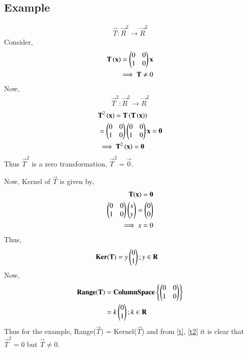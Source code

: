 \documentclass[journal,12pt,twocolumn]{IEEEtran}
\begin{document}
\subsection{Example}
\begin{align}
    \vec{T} : \vec{R}^2 \xrightarrow{} \vec{R}^2
\end{align}
Consider, 
\begin{align}
    \mathbf{T}\left(\mathbf{x}\right) = \begin{pmatrix}0&0\\1&0\end{pmatrix}\mathbf{x} \\
    \implies \mathbf{T} \ne 0 \label{t}
\end{align}
Now,
\begin{align}
    \vec{T}^2 : \vec{R}^2 \xrightarrow{} \vec{R}^2
\end{align}
\begin{align}
    &\mathbf{T}^2\left(\mathbf{x}\right) = \mathbf{T}\left(\mathbf{T}\left(\mathbf{x}\right)\right) \\
    &= \begin{pmatrix}0&0\\1&0\end{pmatrix}\begin{pmatrix}0&0\\1&0\end{pmatrix}\mathbf{x} = \mathbf{0} \\
    &\implies \mathbf{T}^2\left(\mathbf{x}\right) = \mathbf{0} \label{t2}
\end{align}
Thus $\vec{T}^2$ is a zero transformation, $\vec{T}^2 = \vec{0}$.

Now, Kernel of $\vec{T}$ is given by,
\begin{align}
    \mathbf{T}(\mathbf{x}) = \mathbf{0}  \\
    \begin{pmatrix}0&0\\1&0\end{pmatrix}\begin{pmatrix}x\\y\end{pmatrix} = \begin{pmatrix}0\\0\end{pmatrix} \\
    \implies x = 0
\end{align}
Thus, 
\begin{align}
    \mathbf{Ker}(\mathbf{T}) &= y\begin{pmatrix}0\\1\end{pmatrix} ; y \in \mathbf{R}
\end{align}
Now, 
\begin{align}
    \mathbf{Range}(\mathbf{T}) &= \mathbf{ColumnSpace}\left\{\begin{pmatrix}0&0\\1&0\end{pmatrix}\right\} \\
    &= k\begin{pmatrix}0\\1\end{pmatrix} ; k \in \mathbf{R}
\end{align}
Thus for the example, Range($\vec{T}$) = Kernel($\vec{T}$) and from \eqref{t}, \eqref{t2} it is clear that 
$\vec{T}^2 = 0$ but $\vec{T}\ne 0$.
\end{document}
